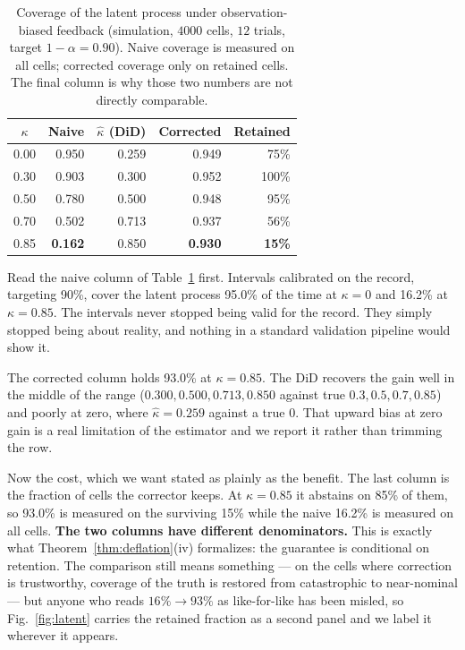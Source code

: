 \documentclass[journal,10pt,twocolumn]{IEEEtran}
\begin{document}
\begin{table}[!t]
  \centering
  \caption{Coverage of the latent process under observation-biased feedback
  (simulation, $4000$ cells, $12$ trials, target $1-\alpha = 0.90$). Naive
  coverage is measured on all cells; corrected coverage only on retained cells.
  The final column is why those two numbers are not directly comparable.}
  \label{tab:feedback}
  \footnotesize
  \begin{tabular}{c r r r r}
    \toprule
    $\kappa$ & \textbf{Naive} & $\hat\kappa$ \textbf{(DiD)} &
      \textbf{Corrected} & \textbf{Retained} \\
    \midrule
    0.00 & 0.950 & 0.259 & 0.949 & 75\% \\
    0.30 & 0.903 & 0.300 & 0.952 & 100\% \\
    0.50 & 0.780 & 0.500 & 0.948 & 95\% \\
    0.70 & 0.502 & 0.713 & 0.937 & 56\% \\
    0.85 & \textbf{0.162} & 0.850 & \textbf{0.930} & \textbf{15\%} \\
    \bottomrule
  \end{tabular}
\end{table}

Read the naive column of Table~\ref{tab:feedback} first. Intervals calibrated on the record, targeting 90\%,
cover the latent process 95.0\% of the time at $\kappa = 0$ and 16.2\% at
$\kappa = 0.85$. The intervals never stopped being valid for the record. They
simply stopped being about reality, and nothing in a standard validation pipeline
would show it.

The corrected column holds 93.0\% at $\kappa = 0.85$. The DiD recovers the gain
well in the middle of the range ($0.300, 0.500, 0.713, 0.850$ against true
$0.3, 0.5, 0.7, 0.85$) and poorly at zero, where $\hat\kappa = 0.259$ against a
true $0$. That upward bias at zero gain is a real limitation of the estimator and
we report it rather than trimming the row.

Now the cost, which we want stated as plainly as the benefit. The last column is
the fraction of cells the corrector keeps. At $\kappa = 0.85$ it abstains on 85\%
of them, so 93.0\% is measured on the surviving 15\% while the naive 16.2\% is
measured on all cells. \textbf{The two columns have different denominators.} This
is exactly what Theorem~\ref{thm:deflation}(iv) formalizes: the guarantee is
conditional on retention. The comparison still means something --- on the cells
where correction is trustworthy, coverage of the truth is restored from
catastrophic to near-nominal --- but anyone who reads $16\% \to 93\%$ as
like-for-like has been misled, so Fig.~\ref{fig:latent} carries the retained
fraction as a second panel and we label it wherever it appears.
\end{document}
